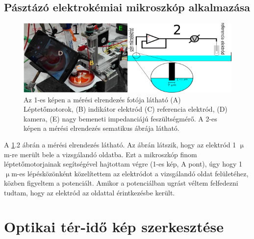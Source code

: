 \subsection{Pásztázó elektrokémiai mikroszkóp alkalmazása}

\begin{figure}[!h]
\centering
\includegraphics[width=1\textwidth]{img/secm.png}
\caption{Az 1-es képen a mérési elrendezés fotója látható (A) Léptetőmotorok, (B) indikátor elektród (C) referencia elektród, (D) kamera, (E) nagy bemeneti impedanciájú feszültségmérő. A 2-es képen a mérési elrendezés sematikus ábrája látható.}
\label{fig:secm}
\end{figure}

A \ref{fig:secm}.2 ábrán a mérési elrendezés látható. Az ábrán látszik, hogy az elektród 1 $\upmu$m-re merült bele a vizsgálandó oldatba. Ezt a mikroszkóp finom léptetőmotorjainak segítségével hajtottam végre (1-es kép, A pont), úgy hogy 1 $\upmu$m-es lépésközönként közelítettem az elektródot a vizsgálandó oldat felületéhez, közben figyeltem a potenciált. Amikor a potenciálban ugrást véltem felfedezni tudtam, hogy az elektród az oldattal érintkezésbe került.

\section{Optikai tér-idő kép szerkesztése}

